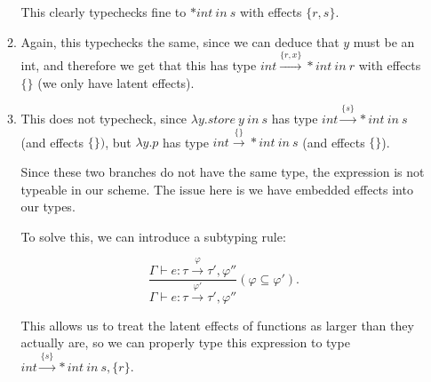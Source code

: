 \begin{enumerate}[label=(\alph*)]
\begin{enumerate}[label=(\roman*)]
        This clearly typechecks fine to $*int\ in\ s$ with effects $\{r, s\}$.

      \item
        Again, this typechecks the same, since we can deduce that $y$ must be an int, and therefore we get that this has type $int \xrightarrow{\{r,x\}}*int\ in\ r$ with effects $\{\}$ (we only have latent effects).

      \item
        This does not typecheck, since $\lambda y. store\ y\ in\ s$ has type $int \xrightarrow{\{s\}} *int\ in\ s$ (and effects $\{\})$, but $\lambda y. p$ has type $int \xrightarrow{\{\}} *int\ in\ s$ (and effects $\{\}$).

        Since these two branches do not have the same type, the expression is not typeable in our scheme. The issue here is we have embedded effects into our types.

        To solve this, we can introduce a subtyping rule:

        \[
          \frac{\Gamma \vdash e : \tau \xrightarrow{\varphi} \tau', \varphi''}{\Gamma \vdash e : \tau \xrightarrow{\varphi'} \tau', \varphi''}(\varphi \subseteq \varphi')
        .\] 

        This allows us to treat the latent effects of functions as larger than they actually are, so we can properly type this expression to type $int \xrightarrow{\{s\}}*int\ in\ s, \{r\}$.

        
    \end{enumerate}
        
\end{enumerate}

